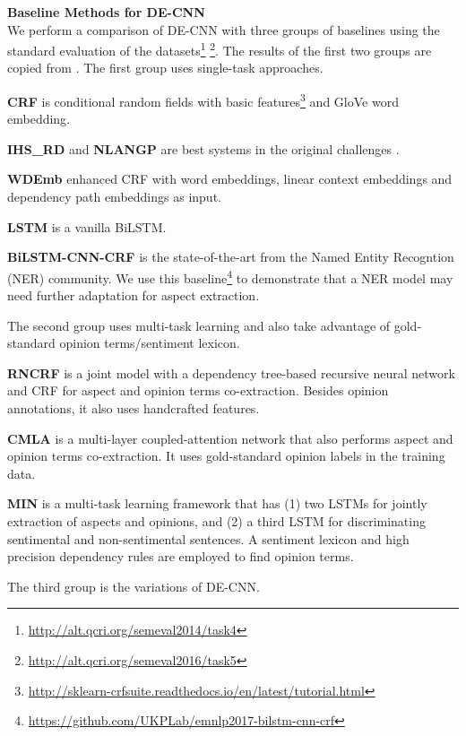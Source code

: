 \textbf{Baseline Methods for DE-CNN}\\
We perform a comparison of DE-CNN with three groups of baselines using the standard evaluation of the datasets\footnote{\url{http://alt.qcri.org/semeval2014/task4}} \footnote{\url{http://alt.qcri.org/semeval2016/task5}}.
The results of the first two groups are copied from \cite{li2017deep}.
The first group uses single-task approaches.

\textbf{CRF} is conditional random fields with basic features\footnote{\url{http://sklearn-crfsuite.readthedocs.io/en/latest/tutorial.html} } and GloVe word embedding\cite{pennington2014glove}.

\textbf{IHS\_RD} \cite{chernyshevich2014ihs} and \textbf{NLANGP} \cite{toh2016nlangp} are best systems in the original challenges \cite{pontiki2014SemEval,pontiki2016semeval}.

\textbf{WDEmb} \cite{yin2016unsupervised} enhanced CRF with word embeddings, linear context embeddings and dependency path embeddings as input.

\textbf{LSTM} \cite{liu2015fine,li2017deep} is a vanilla BiLSTM.

\textbf{BiLSTM-CNN-CRF} \cite{Reimers:2017:EMNLP} is the state-of-the-art from the Named Entity Recogntion (NER) community. We use this baseline\footnote{\url{https://github.com/UKPLab/emnlp2017-bilstm-cnn-crf} } to demonstrate that a NER model may need further adaptation for aspect extraction.

The second group uses multi-task learning and also take advantage of gold-standard opinion terms/sentiment lexicon.

\textbf{RNCRF} \cite{wang2016recursive} is a joint model with a dependency tree-based recursive neural network and CRF for aspect and opinion terms co-extraction. 
Besides opinion annotations, it also uses handcrafted features.

\textbf{CMLA} \cite{wang2017coupled} is a multi-layer coupled-attention network that also performs aspect and opinion terms co-extraction. It uses gold-standard opinion labels in the training data.

\textbf{MIN} \cite{li2017deep} is a multi-task learning framework that has (1) two LSTMs for jointly extraction of aspects and opinions, and (2) a third LSTM for discriminating sentimental and non-sentimental sentences. 
A sentiment lexicon and high precision dependency rules are employed to find opinion terms. 

The third group is the variations of DE-CNN.

